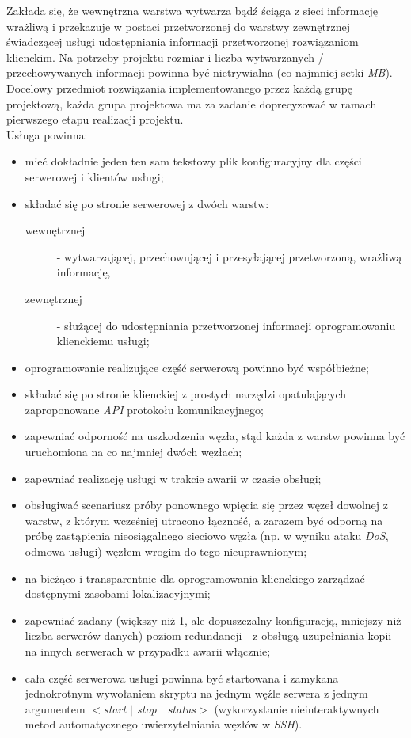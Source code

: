 \documentclass[a4paper,11pt]{article}
\begin{document}
  Zakłada się, że wewnętrzna warstwa wytwarza bądź ściąga z sieci informację wrażliwą i przekazuje w postaci przetworzonej
  do warstwy zewnętrznej świadczącej usługi udostępniania informacji przetworzonej rozwiązaniom klienckim.
  Na potrzeby projektu rozmiar i liczba wytwarzanych / przechowywanych informacji powinna być nietrywialna (co najmniej setki \textit{MB}).
  Docelowy przedmiot rozwiązania implementowanego przez każdą grupę projektową, każda grupa projektowa ma za zadanie doprecyzować w ramach pierwszego etapu realizacji projektu. \\
  
  Usługa powinna:
  
  \begin{itemize}
    \item mieć dokładnie jeden ten sam tekstowy plik konfiguracyjny dla części serwerowej i klientów usługi;
    \item składać się po stronie serwerowej z dwóch warstw: 
    \begin{description}
      \item[wewnętrznej] - wytwarzającej, przechowującej i przesyłającej przetworzoną, wrażliwą informację, 
      \item[zewnętrznej] - służącej do udostępniania przetworzonej informacji oprogramowaniu klienckiemu usługi;
    \end{description}
    \item oprogramowanie realizujące część serwerową powinno być współbieżne;
    \item składać się po stronie klienckiej z prostych narzędzi opatulających zaproponowane \textit{API} protokołu komunikacyjnego;
    \item zapewniać odporność na uszkodzenia węzła, stąd każda z warstw powinna być uruchomiona na co najmniej dwóch węzłach;
    \item zapewniać realizację usługi w trakcie awarii w czasie obsługi;
    \item obsługiwać scenariusz próby ponownego wpięcia się przez węzeł dowolnej z warstw, z którym wcześniej utracono łączność, a zarazem być odporną
      na próbę zastąpienia nieosiągalnego sieciowo węzła (np. w wyniku ataku \textit{DoS}, odmowa usługi) węzłem wrogim do tego nieuprawnionym;
    \item na bieżąco i transparentnie dla oprogramowania klienckiego zarządzać dostępnymi zasobami lokalizacyjnymi;
    \item zapewniać zadany (większy niż 1, ale dopuszczalny konfiguracją, mniejszy niż liczba serwerów danych) poziom redundancji
      - z obsługą uzupełniania kopii na innych serwerach w przypadku awarii włącznie;
    \item cała część serwerowa usługi powinna być startowana i zamykana jednokrotnym wywołaniem skryptu na jednym węźle serwera z jednym argumentem
      \textit{$<$start $|$ stop $|$ status$>$}
      (wykorzystanie nieinteraktywnych metod automatycznego uwierzytelniania węzłów w \textit{SSH}).
  \end{itemize}
  
\end{document}
